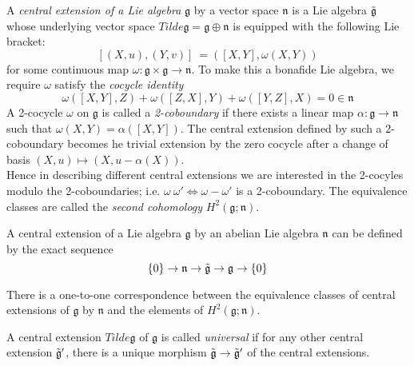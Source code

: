 \begin{defn}

	A \textit{central extension of a Lie algebra} $ \mathfrak{g}$ by a vector space $ \mathfrak{n}$ is a Lie algebra $ \Tilde{ \mathfrak{g}}$ whose underlying vector space $Tilde{ \mathfrak{g}} = \mathfrak{g} \oplus \mathfrak{n}$ is equipped with the following Lie bracket:
	\[	[ (X,u),(Y,v)]^{~} = ([X,Y], \omega(X,Y))	\]
for some continuous map $ \omega: \mathfrak{g} \times \mathfrak{g} \to \mathfrak{n}$. To make this a bonafide Lie algebra, we require $\omega$ satisfy the \textit{cocycle identity}
\[	\omega([X,Y],Z) + \omega([Z,X],Y) + \omega([Y,Z],X) = 0 \in \mathfrak{n}\]
A 2-cocycle $ \omega$ on $ \mathfrak{g}$ is called a \textit{2-coboundary} if there exists a linear map $ \alpha: \mathfrak{g} \to \mathfrak{n}$ such that $\omega(X,Y) = \alpha ([X,Y])$. The central extension defined by such a 2-coboundary becomes he trivial extension by the zero cocycle after a change of basis $ (X,u) \mapsto (X, u - \alpha(X))$.\\
\indent Hence in describing different central extensions we are interested in the 2-cocyles modulo the 2-coboundaries; i.e. $\omega ~ \omega ' \iff \omega - \omega '$ is a 2-coboundary. The equivalence classes are called the \textit{second cohomology} $H^2( \mathfrak{g}; \mathfrak{n})$. 
\end{defn}


\begin{rmk}

A central extension of a Lie algebra $ \mathfrak{g}$ by an abelian Lie algebra $ \mathfrak{n}$ can be defined by the exact sequence
\[
	\{0\} \to \mathfrak{n} \to \Tilde{ \mathfrak{g}} \to \mathfrak{g} \to \{0\}
\]

\end{rmk}


\begin{prop}

	There is a one-to-one correspondence between the equivalence classes of central extensions of $ \mathfrak{g}$ by $ \mathfrak{n}$ and the elements of $H^2( \mathfrak{g}; \mathfrak{n})$.

\end{prop}


\begin{defn}

	A central extension $Tilde{ \mathfrak{g}}$ of $ \mathfrak{g}$ is called \textit{universal} if for any other central extension $ \Tilde{ \mathfrak{g}}'$, there is a unique morphism $\Tilde{ \mathfrak{g}} \to \Tilde{ \mathfrak{g}}'$ of the central extensions.

\end{defn}



